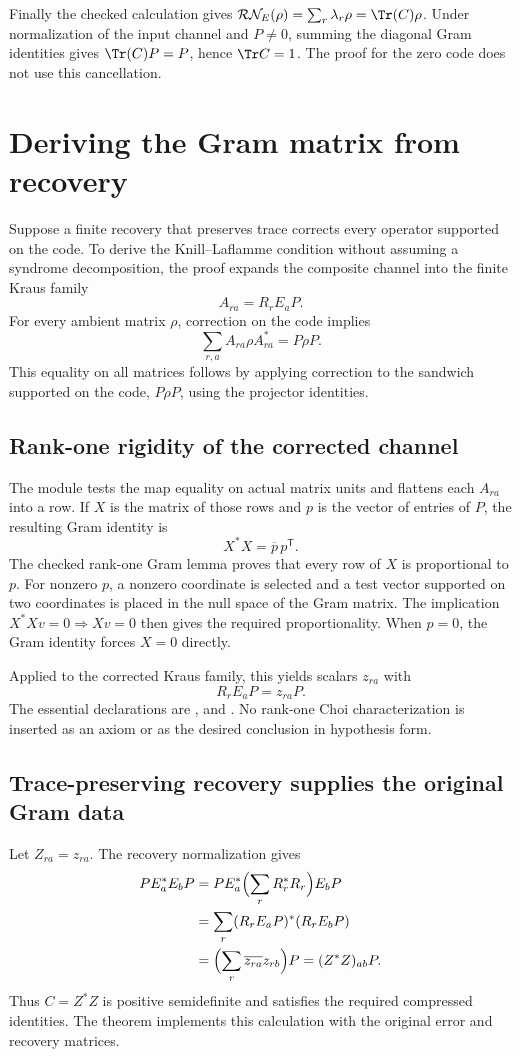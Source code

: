 Finally the checked calculation gives $\mathcal R\mathcal N_E(\rho)=\sum_r\lambda_r\rho=\Tr(C)\rho$. Under normalization of the input channel and $P\ne0$, summing the diagonal Gram identities gives $\Tr(C)P=P$, hence $\Tr C=1$. The proof for the zero code does not use this cancellation.



\section{Deriving the Gram matrix from recovery}\label{supp5:section:003}
Suppose a finite recovery that preserves trace corrects every operator supported on the code. To derive the Knill--Laflamme condition without assuming a syndrome decomposition, the proof expands the composite channel into the finite Kraus family
\[
A_{ra}=R_rE_aP.
\]
For every ambient matrix $\rho$, correction on the code implies
\[
\sum_{r,a} A_{ra}\rho A_{ra}^*=P\rho P.
\]
This equality on all matrices follows by applying correction to the sandwich supported on the code, $P\rho P$, using the projector identities.

\subsection{Rank-one rigidity of the corrected channel}
The module tests the map equality on actual matrix units and flattens each $A_{ra}$ into a row. If $X$ is the matrix of those rows and $p$ is the vector of entries of $P$, the resulting Gram identity is
\[
X^*X=\overline p\,p^{\mathsf T}.
\]
The checked rank-one Gram lemma proves that every row of $X$ is proportional to $p$. For nonzero $p$, a nonzero coordinate is selected and a test vector supported on two coordinates is placed in the null space of the Gram matrix. The implication $X^*Xv=0\Rightarrow Xv=0$ then gives the required proportionality. When $p=0$, the Gram identity forces $X=0$ directly.

Applied to the corrected Kraus family, this yields scalars $z_{ra}$ with
\[
R_rE_aP=z_{ra}P.
\]
The essential declarations are ,  and . No rank-one Choi characterization is inserted as an axiom or as the desired conclusion in hypothesis form.

\subsection{Trace-preserving recovery supplies the original Gram data}
Let $Z_{ra}=z_{ra}$. The recovery normalization gives
\begin{align*}
PE_a^*E_bP
&=PE_a^*\Bigl(\sum_rR_r^*R_r\Bigr)E_bP\\
&=\sum_r(R_rE_aP)^*(R_rE_bP)\\
&=\Bigl(\sum_r\overline{z_{ra}}z_{rb}\Bigr)P
=(Z^*Z)_{ab}P.
\end{align*}
Thus $C=Z^*Z$ is positive semidefinite and satisfies the required compressed identities. The theorem  implements this calculation with the original error and recovery matrices.

